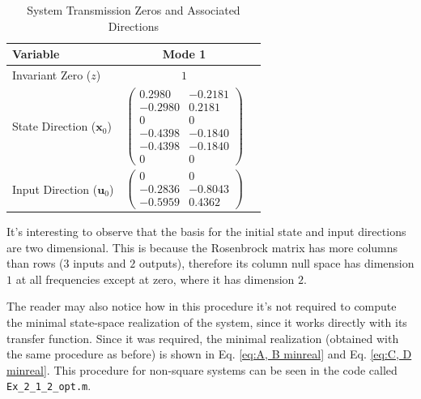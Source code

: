 \documentclass{scrreprt}
\begin{document}
\begin{table}[h]
    \centering
    \caption{System Transmission Zeros and Associated Directions}
    \label{tab:transmission_zeros_nonsquare}
    \renewcommand{\arraystretch}{1.5}
    \begin{tabular}{lcc}
        \toprule
        \textbf{Variable} & \textbf{Mode 1} \\ 
        \midrule
        Invariant Zero ($z$) & $1$ \\ 
        \midrule
        State Direction ($\boldsymbol{x}_0$) & 
        $\begin{pmatrix} 0.2980 & -0.2181 \\ -0.2980 & 0.2181 \\ 0 & 0 \\ -0.4398 & -0.1840\\ -0.4398 & -0.1840 \\ 0 & 0 \end{pmatrix}$ \\ 
        \midrule
        Input Direction ($\boldsymbol{u}_0$) & 
        $\begin{pmatrix} 0 & 0 \\ -0.2836 & -0.8043 \\ -0.5959 & 0.4362 \end{pmatrix}$ \\ 
        \bottomrule
    \end{tabular}
\end{table}

It's interesting to observe that the basis for the initial state and input directions are two dimensional. This is because the Rosenbrock matrix has more columns than rows ($3$ inputs and $2$ outputs), therefore its column null space has dimension $1$ at all frequencies except at zero, where it has dimension $2$.

The reader may also notice how in this procedure it's not required to compute the minimal state-space realization of the system, since it works directly with its transfer function. Since it was required, the minimal realization (obtained with the same procedure as before) is shown in Eq. \ref{eq:A, B minreal} and Eq. \ref{eq:C, D minreal}. This procedure for non-square systems can be seen in the code called \texttt{Ex\_2\_1\_2\_opt.m}.
\end{document}
